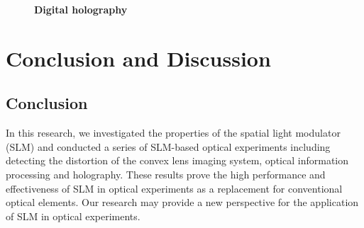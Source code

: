 \documentclass[10pt,a4paper,twocolumn,twoside,UTF8]{article}
\begin{document}
		\begin{figure}[htbp]
			\centering
			\caption{\textbf{Digital holography}}
			\label{fig.4.3}
		\end{figure}


\section{Conclusion and Discussion}
	\subsection{Conclusion}
	In this research, we investigated the properties of the spatial light modulator (SLM) and conducted a series of SLM-based optical experiments
	including detecting the distortion of the convex lens imaging system, optical information processing and holography.
	These results prove the high performance and effectiveness of SLM in optical experiments as a replacement for conventional optical elements.
	Our research may provide a new perspective for the application of SLM in optical experiments.
\end{document}
